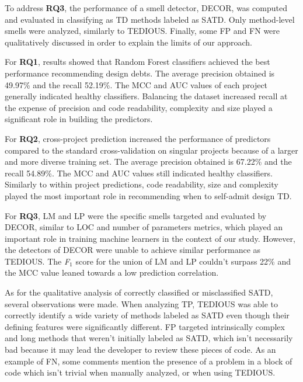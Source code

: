 To address \textbf{RQ3}, the performance of a smell detector, \ac{DECOR}, was computed and evaluated in classifying as \ac{TD} methods labeled as \ac{SATD}. Only method-level smells were analyzed, similarly to \ac{TEDIOUS}. Finally, some \ac{FP} and \ac{FN} were qualitatively discussed in order to explain the limits of our approach. \par

For \textbf{RQ1}, results showed that Random Forest classifiers achieved the best performance recommending design debts. The average precision obtained is 49.97\% and the recall 52.19\%. The MCC and AUC values of each project generally indicated healthy classifiers. Balancing the dataset increased recall at the expense of precision and code readability, complexity and size played a significant role in building the predictors. \par

For \textbf{RQ2}, cross-project prediction increased the performance of predictors compared to the standard cross-validation on singular projects because of a larger and more diverse training set. The average precision obtained is 67.22\% and the recall 54.89\%. The MCC and AUC values still indicated healthy classifiers. Similarly to within project predictions, code readability, size and complexity played the most important role in recommending when to self-admit design \ac{TD}. \par

For \textbf{RQ3}, \ac{LM} and \ac{LP} were the specific smells targeted and evaluated by \ac{DECOR}, similar to \ac{LOC} and number of parameters metrics, which played an important role in training machine learners in the context of our study. However, the detectors of \ac{DECOR} were unable to achieve similar performance as \ac{TEDIOUS}. The \emph{F$_{1}$} score for the union of \ac{LM} and \ac{LP} couldn't surpass 22\% and the \ac{MCC} value leaned towards a low prediction correlation. \par

As for the qualitative analysis of correctly classified or misclassified \ac{SATD}, several observations were made. When analyzing \ac{TP}, \ac{TEDIOUS} was able to correctly identify a wide variety of methods labeled as \ac{SATD} even though their defining features were significantly different. \ac{FP} targeted intrinsically complex and long methods that weren't initially labeled as \ac{SATD}, which isn't necessarily bad because it may lead the developer to review these pieces of code. As an example of \ac{FN}, some comments mention the presence of a problem in a block of code which isn't trivial when manually analyzed, or when using \ac{TEDIOUS}. \par


